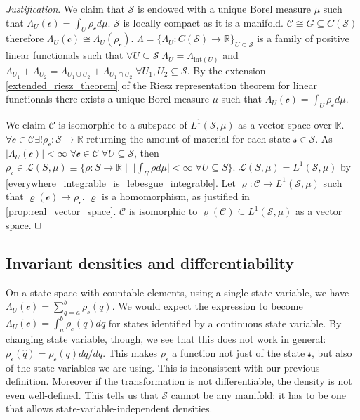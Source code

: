 \documentclass[smallextended]{svjour3}
\numberwithin{equation}{section}
\newenvironment{justification}{\emph{Justification}.}{\hfill\(\qed\)}
\theoremstyle{definition}
\newenvironment{justification}{\emph{Justification}.}{\qed}
\begin{document}
\begin{justification}
	We claim that $\mathcal{S}$ is endowed with a unique Borel measure $\mu$ such that $\Lambda_U (\mathcal{c}) = \int_U \rho_{\mathcal{c}} d \mu$.  $\mathcal{S}$ is locally compact as it is a manifold. $\mathcal{C} \cong G \subseteq C(\mathcal{S})$ therefore $\Lambda_U(\mathcal{c}) \cong \Lambda_U(\rho_\mathcal{c})$. $\Lambda = \{\Lambda_U : C(\mathcal{S}) \rightarrow \mathbb{R}\}_{U \subseteq \mathcal{S}}$ is a family of positive linear functionals such that $\forall U \subseteq \mathcal{S} \; \Lambda_U = \Lambda_{\mathrm{int}(U)}$ and $\Lambda_{U_1} + \Lambda_{U_2} = \Lambda_{U_1 \cup U_2} + \Lambda_{U_1 \cap U_2} \; \forall U_1, U_2 \subseteq \mathcal{S}$. By the extension \ref{extended_riesz_theorem} of the Riesz representation theorem for linear functionals 
	there exists a unique Borel measure $\mu$ such that $\Lambda_U (\mathcal{c}) = \int_{U} \rho_\mathcal{c} d\mu$.

	We claim $\mathcal{C}$ is isomorphic to a subspace of $L^1(\mathcal{S}, \mu)$ as a vector space over $\mathbb{R}$. $\forall \mathcal{c} \in \mathcal{C} \exists ! \rho_{\mathcal{c}}:\mathcal{S} \rightarrow \mathbb{R}$ returning the amount of material for each state $\mathcal{s} \in \mathcal{S}$. As $|\Lambda_{U}(\mathcal{c})| < \infty \; \forall \mathcal{c} \in \mathcal{C} \; \forall U \subseteq \mathcal{S}$, then $\rho_{\mathcal{c}} \in \mathcal{L}(S,\mu) \equiv \{ \rho : S \rightarrow \mathbb{R} \; | \;\; |\int_{U} \rho d\mu| < \infty \; \forall U \subseteq S\}$. $\mathcal{L}(S,\mu) = L^1(\mathcal{S}, \mu)$ by \ref{everywhere_integrable_is_lebesgue_integrable}. Let $\varrho : \mathcal{C} \rightarrow L^1(\mathcal{S}, \mu)$ such that $\varrho(\mathcal{c}) \mapsto \rho_\mathcal{c}$. $\varrho$ is a homomorphism, as justified in \ref{prop:real_vector_space}. $\mathcal{C}$ is isomorphic to $\varrho(\mathcal{C}) \subseteq L^1(\mathcal{S}, \mu)$ as a vector space.
\end{justification}

\subsection{Invariant densities and differentiability}

On a state space with countable elements, using a single state variable, we have $\Lambda_U (\mathcal{c}) = \sum \limits_{q=a}^b \rho_\mathcal{c}(q)$. We would expect the expression to become $\Lambda_U (\mathcal{c}) = \int_a^b \rho_\mathcal{c} (q) dq$ for states identified by a continuous state variable. By changing state variable, though, we see that this does not work in general: $\rho_\mathcal{c}(\hat{q})= \rho_\mathcal{c}(q) dq/d\hat{q}$. This makes $\rho_\mathcal{c}$ a function not just of the state $\mathcal{s}$, but also of the state variables we are using. This is inconsistent with our previous definition. Moreover if the transformation is not differentiable, the density is not even well-defined. This tells us that $\mathcal{S}$ cannot be any manifold: it has to be one that allows state-variable-independent densities.
\end{document}
